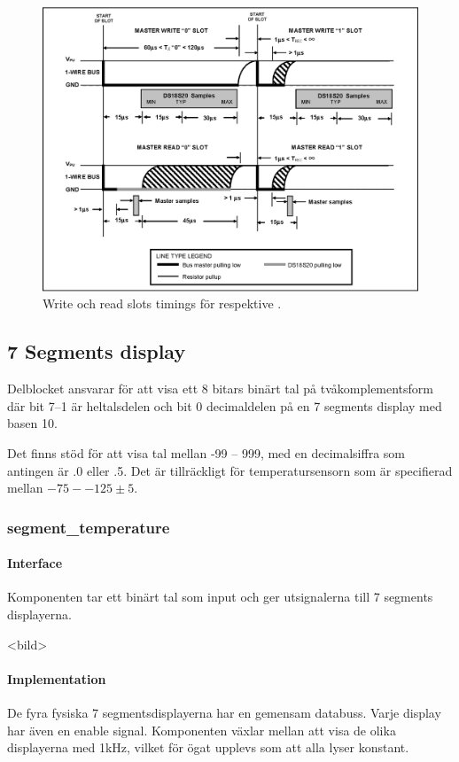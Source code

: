 \begin{figure}
\centering
\includegraphics[width=\textwidth]{write_slot.eps}
\caption{Write och read slots timings för \low{} respektive \high{}.}
\label{fig:rwslots}
\end{figure}



\subsection{7 Segments display}\label{sec:7seg}
Delblocket ansvarar för att visa ett 8 bitars binärt tal på tvåkomplementsform där bit 7--1 är heltalsdelen och bit 0 decimaldelen på en 7 segments display med basen 10.

Det finns stöd för att visa tal mellan -99 -- 999, med en decimalsiffra som antingen är .0 eller .5. Det är tillräckligt för temperatursensorn som är specifierad mellan $-75 -- 125 \pm5$.
\subsubsection{segment\_temperature}

\paragraph{Interface}
Komponenten tar ett binärt tal som input och ger utsignalerna till 7 segments displayerna.

<bild>

\paragraph{Implementation}
De fyra fysiska 7 segmentsdisplayerna har en gemensam databuss. Varje display har även en enable signal. Komponenten växlar mellan att visa de olika displayerna med 1kHz, vilket för ögat upplevs som att alla lyser konstant.
